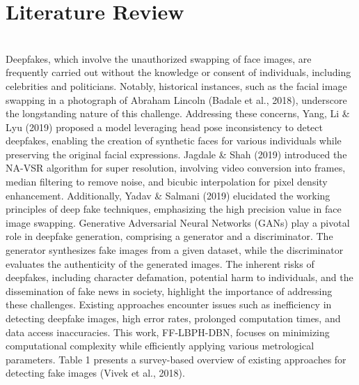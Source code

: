 \chapter{Literature Review}
\\
Deepfakes, which involve the unauthorized swapping of face images, are frequently carried out without the knowledge or consent of individuals, including celebrities and politicians. Notably, historical instances, such as the facial image swapping in a photograph of Abraham Lincoln (Badale et al., 2018), underscore the longstanding nature of this challenge. Addressing these concerns, Yang, Li \& Lyu (2019) proposed a model leveraging head pose inconsistency to detect deepfakes, enabling the creation of synthetic faces for various individuals while preserving the original facial expressions.
Jagdale \& Shah (2019) introduced the NA-VSR algorithm for super resolution, involving video conversion into frames, median filtering to remove noise, and bicubic interpolation for pixel density enhancement. Additionally, Yadav \& Salmani (2019) elucidated the working principles of deep fake techniques, emphasizing the high precision value in face image swapping.
Generative Adversarial Neural Networks (GANs) play a pivotal role in deepfake generation, comprising a generator and a discriminator. The generator synthesizes fake images from a given dataset, while the discriminator evaluates the authenticity of the generated images. The inherent risks of deepfakes, including character defamation, potential harm to individuals, and the dissemination of fake news in society, highlight the importance of addressing these challenges.
Existing approaches encounter issues such as inefficiency in detecting deepfake images, high error rates, prolonged computation times, and data access inaccuracies. This work, FF-LBPH-DBN, focuses on minimizing computational complexity while efficiently applying various metrological parameters. Table 1 presents a survey-based overview of existing approaches for detecting fake images (Vivek et al., 2018).

